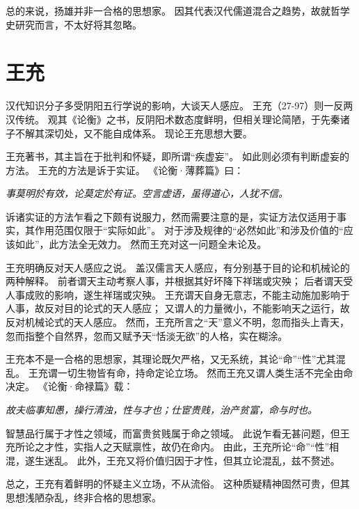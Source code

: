 \documentclass[11pt]{article}
\begin{document}
总的来说，扬雄并非一合格的思想家。
因其代表汉代儒道混合之趋势，故就哲学史研究而言，不太好将其忽略。

\section{王充}
汉代知识分子多受阴阳五行学说的影响，大谈天人感应。
王充（27-97）则一反两汉传统。
观其《论衡》之书，反阴阳术数态度鲜明，但相关理论简陋，于先秦诸子不解其深切处，又不能自成体系。
现论王充思想大要。

\newline

王充著书，其主旨在于批判和怀疑，即所谓“疾虚妄”。
如此则必须有判断虚妄的方法。
王充的方法是诉于实证。
《论衡·薄葬篇》曰：

\textit{事莫明於有效，论莫定於有证。空言虚语，虽得道心，人犹不信。}

诉诸实证的方法乍看之下颇有说服力，然而需要注意的是，实证方法仅适用于事实，其作用范围仅限于“实际如此”。
对于涉及规律的“必然如此”和涉及价值的“应该如此”，此方法全无效力。
然而王充对这一问题全未论及。

\newline

王充明确反对天人感应之说。
盖汉儒言天人感应，有分别基于目的论和机械论的两种解释。
前者谓天主动考察人事，并根据其好坏降下祥瑞或灾殃；
后者谓天受人事成败的影响，遂生祥瑞或灾殃。
王充谓天自身无意志，不能主动施加影响于人事，故反对目的论式的天人感应；
又谓人的力量微小，不能影响天之运行，故反对机械论式的天人感应。
然而，王充所言之“天”意义不明，忽而指头上青天，忽而指整个自然界，忽而又赋予天“恬淡无欲”的人格，实在糊涂。

\newline

王充本不是一合格的思想家，其理论既欠严格，又无系统，其论“命”“性”尤其混乱。
王充谓一切生物皆有命，持命定论立场。
然而王充又谓人类生活不完全由命决定。
《论衡·命禄篇》载：

\textit{故夫临事知愚，操行清浊，性与才也；仕宦贵贱，治产贫富，命与时也。}

智慧品行属于才性之领域，而富贵贫贱属于命之领域。
此说乍看无甚问题，但王充所论之才性，实指人之天赋禀性，故仍在命内。
由此，王充所论“命”“性”相混，遂生迷乱。
此外，王充又将价值归因于才性，但其立论混乱，兹不赘述。

\newline

总之，王充有着鲜明的怀疑主义立场，不从流俗。
这种质疑精神固然可贵，但其思想浅陋杂乱，终非合格的思想家。
\end{document}
